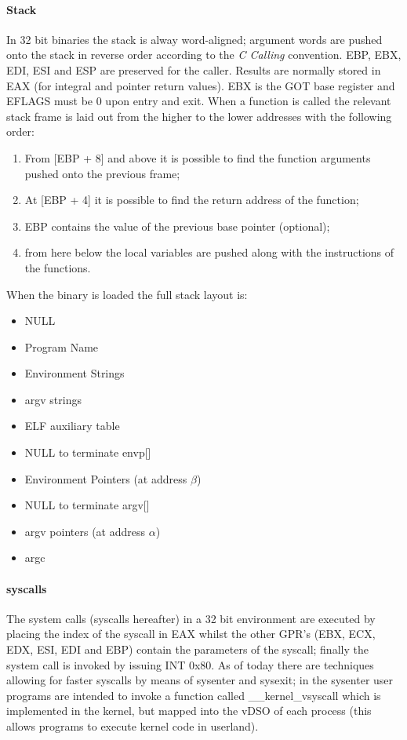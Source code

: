 \paragraph{Stack}
In 32 bit binaries the stack is alway word-aligned; argument words are pushed onto the stack in reverse order according
to the \textit{C Calling} convention. {\ttfamily EBP}, {\ttfamily EBX}, {\ttfamily EDI}, {\ttfamily ESI} and {\ttfamily
ESP} are preserved for the caller. Results are normally stored in {\ttfamily EAX} (for integral and pointer return values).
{\ttfamily EBX} is the GOT base register and {\ttfamily EFLAGS} must be 0 upon entry and exit. When a function is
called the relevant stack frame is laid out from the higher to the lower addresses with the following order:
\begin{enumerate}
    \item From [{\ttfamily EBP + 8}] and above it is possible to find the function arguments pushed onto the previous
        frame;
    \item At [{\ttfamily EBP + 4}] it is possible to find the return address of the function;
    \item {\ttfamily EBP} contains the value of the previous base pointer (optional);
    \item from here below the local variables are pushed along with the instructions of the functions.
\end{enumerate}
When the binary is loaded the full stack layout is:
\begin{itemize}
    \item NULL
    \item Program Name
    \item Environment Strings
    \item {\ttfamily argv} strings
    \item ELF auxiliary table
    \item NULL to terminate {\ttfamily envp[]}
    \item Environment Pointers (at address $\beta$)
    \item NULL to terminate {\ttfamily argv[]}
    \item {\ttfamily argv} pointers (at address $\alpha$)
    \item {\ttfamily argc}
\end{itemize}
\paragraph{{\ttfamily syscalls}}
The system calls (syscalls hereafter) in a 32 bit environment are executed by placing the index of the syscall in
EAX whilst the other GPR's (EBX, ECX, EDX, ESI, EDI and EBP) contain the parameters of the syscall; finally
the system call is invoked by issuing {\ttfamily INT 0x80}.
As of today there are techniques allowing for faster syscalls by means of {\ttfamily sysenter} and {\ttfamily sysexit};
in the {\ttfamily sysenter} user programs are intended to invoke a function called {\ttfamily \_\_kernel\_vsyscall}
which is implemented in the kernel, but mapped into the vDSO of each process (this allows programs to execute kernel
code in userland).

